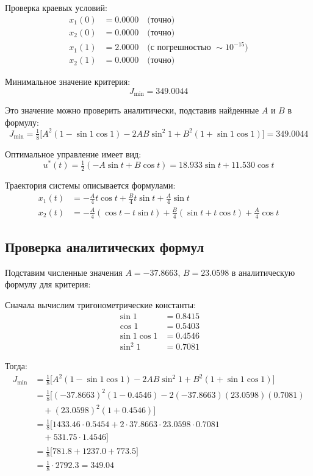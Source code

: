 Проверка краевых условий:
\begin{align}
x_1(0) &= 0.0000 \quad \text{(точно)} \\
x_2(0) &= 0.0000 \quad \text{(точно)} \\
x_1(1) &= 2.0000 \quad \text{(с погрешностью } \sim 10^{-15}\text{)} \\
x_2(1) &= 0.0000 \quad \text{(точно)}
\end{align}

Минимальное значение критерия:
\[
J_{\min} = 349.0044
\]

Это значение можно проверить аналитически, подставив найденные \(A\) и \(B\) в формулу:
\[
J_{\min} = \tfrac{1}{8}\big[A^2(1-\sin 1\cos 1) - 2AB\sin^2 1 + B^2(1+\sin 1\cos 1)\big] = 349.0044
\]

Оптимальное управление имеет вид:
\[
u^*(t) = \tfrac{1}{2}(-A\sin t + B\cos t) = 18.933\sin t + 11.530\cos t
\]

Траектория системы описывается формулами:
\begin{align}
x_1(t) &= -\tfrac{A}{4}t\cos t + \tfrac{B}{4}t\sin t + \tfrac{A}{4}\sin t \\
x_2(t) &= -\tfrac{A}{4}(\cos t - t\sin t) + \tfrac{B}{4}(\sin t + t\cos t) + \tfrac{A}{4}\cos t
\end{align}

\subsection{Проверка аналитических формул}
Подставим численные значения \(A = -37.8663\), \(B = 23.0598\) в аналитическую формулу для критерия:

Сначала вычислим тригонометрические константы:
\begin{align}
\sin 1 &= 0.8415 \\
\cos 1 &= 0.5403 \\
\sin 1 \cos 1 &= 0.4546 \\
\sin^2 1 &= 0.7081
\end{align}

Тогда:
\begin{align}
J_{\min} &= \tfrac{1}{8}\big[A^2(1-\sin 1\cos 1) - 2AB\sin^2 1 + B^2(1+\sin 1\cos 1)\big] \\
&= \tfrac{1}{8}\big[(-37.8663)^2(1-0.4546) - 2(-37.8663)(23.0598)(0.7081) \\
&\quad + (23.0598)^2(1+0.4546)\big] \\
&= \tfrac{1}{8}\big[1433.46 \cdot 0.5454 + 2 \cdot 37.8663 \cdot 23.0598 \cdot 0.7081 \\
&\quad + 531.75 \cdot 1.4546\big] \\
&= \tfrac{1}{8}\big[781.8 + 1237.0 + 773.5\big] \\
&= \tfrac{1}{8} \cdot 2792.3 = 349.04
\end{align}

